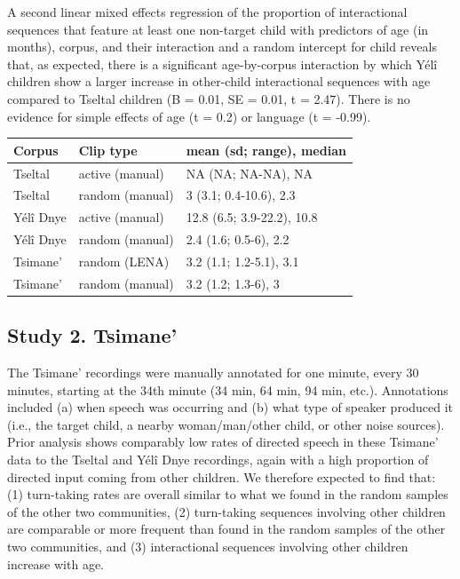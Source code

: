 \documentclass[10pt, letterpaper]{article}
\begin{document}
A second linear mixed effects regression of the proportion of
interactional sequences that feature at least one non-target child with
predictors of age (in months), corpus, and their interaction and a
random intercept for child reveals that, as expected, there is a
significant age-by-corpus interaction by which Yélî children show a
larger increase in other-child interactional sequences with age compared
to Tseltal children (B = 0.01, SE = 0.01, t = 2.47). There is no
evidence for simple effects of age (t = 0.2) or language (t = -0.99).

\begin{table}[h]
\centering
\begin{tabular}{lll}
  \hline
Corpus & Clip type & mean (sd; range), median \\ 
  \hline
Tseltal & active (manual) & NA (NA; NA-NA), NA \\ 
  Tseltal & random (manual) & 3 (3.1; 0.4-10.6), 2.3 \\ 
  Yélî Dnye & active (manual) & 12.8 (6.5; 3.9-22.2), 10.8 \\ 
  Yélî Dnye & random (manual) & 2.4 (1.6; 0.5-6), 2.2 \\ 
  Tsimane' & random (LENA) & 3.2 (1.1; 1.2-5.1), 3.1 \\ 
  Tsimane' & random (manual) & 3.2 (1.2; 1.3-6), 3 \\ 
   \hline
\end{tabular}
\end{table}

\hypertarget{study-2.-tsimane}{%
\subsection{Study 2. Tsimane'}\label{study-2.-tsimane}}

The Tsimane' recordings were manually annotated for one minute, every 30
minutes, starting at the 34th minute (34 min, 64 min, 94 min, etc.).
Annotations included (a) when speech was occurring and (b) what type of
speaker produced it (i.e., the target child, a nearby woman/man/other
child, or other noise sources). Prior analysis shows comparably low
rates of directed speech in these Tsimane' data to the Tseltal and Yélî
Dnye recordings, again with a high proportion of directed input coming
from other children. We therefore expected to find that: (1) turn-taking
rates are overall similar to what we found in the random samples of the
other two communities, (2) turn-taking sequences involving other
children are comparable or more frequent than found in the random
samples of the other two communities, and (3) interactional sequences
involving other children increase with age.
\end{document}

